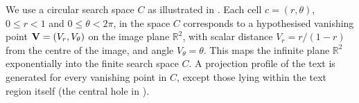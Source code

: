 We use a circular search space $C$ as illustrated in .
Each cell $c=(r,\theta)$,
$ 0 \leq r < 1 $ and $ 0 \leq \theta < 2\pi $,
in the space $C$ corresponds to a hypothesised vanishing point ${ \bf V } = (V_r,V_{\theta})$
on the image plane $\mathbb{R}^2$, with
scalar distance $V_{r}=r/{(1-r)}$ from the centre of the image,
and angle $V_{\theta}=\theta$.
This maps the infinite plane $\mathbb{R}^2$ exponentially into the finite search space $C$.
A projection profile of the text is generated for
every vanishing point in $C$, except those lying within
the text region itself (the central hole in ).



\begin{comment}
The projection profile of a binary image with respect to a vanishing
point $\myvec{V}$ is obtained 
by collecting each pixel into a bin representing the angle between the
vanishing point and 
the pixel.  Relative to the vanishing point, the text region will fall
within a small 
range of angles, depending on the distance and position of the vanishing point.
In order to accumulate projection profiles which are comparable to each other, the angular
range over which each projection profile is taken is set accordingly.  In other words, the
left and right bins of the projection profile correspond to the left and right angles
within which the text region lies.  This ensures that the projection profile of a distant
vanishing point will not accumulate a tighter distribution, as would be the case if all
projection profiles were accumulated in the range $0-2\pi$.
*** !Kill above paragraph?  Keep next but make clearer! ***
*** !Alternative paragraph to the last!  Which do you prefer?!
\end{comment}


